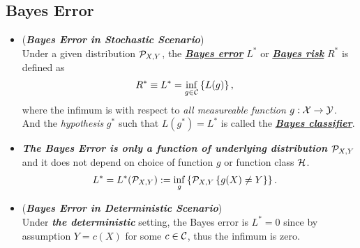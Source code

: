 \documentclass[11pt]{article}
\begin{document}
\subsection{Bayes Error}
\begin{itemize}
\item  \begin{definition} (\emph{\textbf{Bayes Error in Stochastic Scenario}})\\
Under a given distribution ${\mathcal P}_{X, Y}$,  the \underline{\emph{\textbf{Bayes error}}} $L^{*}$ or \underline{\emph{\textbf{Bayes risk}}} $R^{*}$ is defined as 
\begin{align}
R^{*} \equiv L^{*} &= \inf_{g \in {\mathcal C}}\left\{L(g)\right\}, \label{expr: Bayes_err}
\end{align} where the infimum is with respect to \emph{all measureable function} $g: {\mathcal X} \rightarrow {\mathcal Y}$. And the \emph{hypothesis} $g^{*}$ such that $L(g^{*})= L^{*}$ is called the \underline{\emph{\textbf{Bayes classifier}}}.
\end{definition}

\item \begin{remark}
\emph{\textbf{The Bayes Error is only a function of underlying distribution ${\mathcal P}_{X,Y}$}} and it does not depend on choice of function $g$ or function class ${\mathcal H}$.
\begin{align*}
 L^{*} &=  L^{*}({\mathcal P}_{X,Y}) := \inf_{g}\left\{{\mathcal P}_{X, Y}\left\{g(X) \neq Y\right\}\right\}.
\end{align*}
\end{remark}

\item \begin{remark}  (\emph{\textbf{Bayes Error in Deterministic Scenario}})\\
Under \emph{\textbf{the deterministic}} setting, the Bayes error is $L^{*}=0$ since by assumption $Y = c(X)$ for some $c \in {\mathcal C}$, thus the infimum is zero. 
\end{remark}


\end{itemize}
\end{document}
